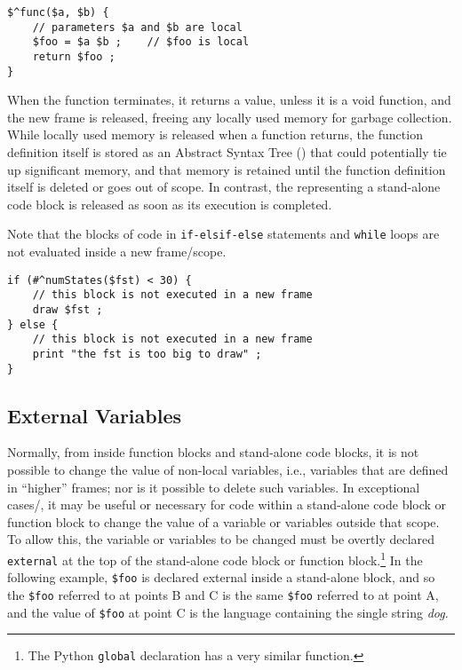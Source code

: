 \begin{Verbatim}
$^func($a, $b) {
    // parameters $a and $b are local
    $foo = $a $b ;    // $foo is local
    return $foo ;
}
\end{Verbatim}

\noindent
When the function terminates, it returns a value, unless it is a void function, and the
new frame is released, freeing any locally used memory for garbage
collection.  While locally used memory is released when a function returns, the
function definition itself is stored as an Abstract Syntax Tree () that could
potentially tie up 
significant memory, and that memory is retained until the function definition
itself is deleted or goes out of scope.  In contrast, the  representing a
stand-alone code block is released as soon as its execution is completed.

Note that the blocks of code in \texttt{if-elsif-else} statements and \texttt{while}
loops are not evaluated inside a new frame/scope.

\begin{Verbatim}
if (#^numStates($fst) < 30) {
    // this block is not executed in a new frame
    draw $fst ;
} else {
    // this block is not executed in a new frame
    print "the fst is too big to draw" ;
}
\end{Verbatim}


\subsection{External Variables}

Normally, from inside function blocks and stand-alone code blocks,
it is not possible to change the value of non-local variables,
i.e., variables that are defined in ``higher'' frames; nor is it
possible to delete such variables.  In exceptional cases/, it may be useful
or necessary for code within a stand-alone code block or function
block to change the value of a variable or variables outside that
scope.  To allow this, the variable or variables to be changed must
be overtly declared \texttt{external} at the top of the stand-alone
code block or function block.\footnote{The Python \texttt{global}
declaration has a very similar function.}  In the following
example, \verb!$foo! is declared external inside a stand-alone
block, and so the \verb!$foo! referred to at points B and C is the
same \verb!$foo! referred to at point A, and the value of
\verb!$foo! at point C is the language containing the single string
\emph{dog}.

